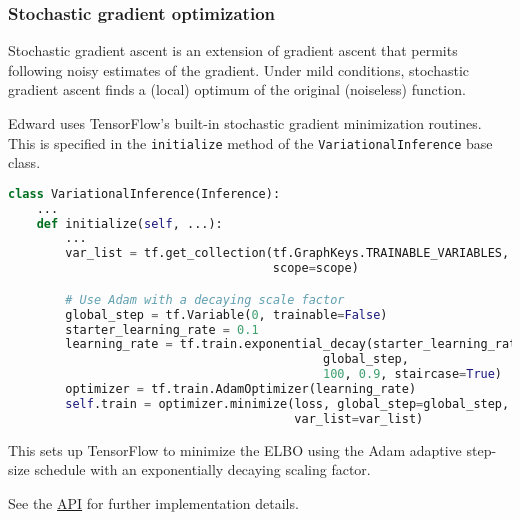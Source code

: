 \subsubsection{Stochastic gradient optimization}

Stochastic gradient ascent is an extension of gradient ascent that permits
following noisy estimates of the gradient. Under mild conditions, stochastic
gradient ascent finds a (local) optimum of the original (noiseless) function.

Edward uses TensorFlow's built-in stochastic gradient minimization routines.
This is specified in the \texttt{initialize} method of the 
\texttt{VariationalInference} base class.

\begin{lstlisting}[language=Python]
class VariationalInference(Inference):
    ...
    def initialize(self, ...):
        ...
        var_list = tf.get_collection(tf.GraphKeys.TRAINABLE_VARIABLES,
                                     scope=scope)

        # Use Adam with a decaying scale factor
        global_step = tf.Variable(0, trainable=False)
        starter_learning_rate = 0.1
        learning_rate = tf.train.exponential_decay(starter_learning_rate,
                                            global_step,
                                            100, 0.9, staircase=True)
        optimizer = tf.train.AdamOptimizer(learning_rate)
        self.train = optimizer.minimize(loss, global_step=global_step,
                                        var_list=var_list)
\end{lstlisting}

This sets up TensorFlow to minimize the ELBO using the Adam adaptive step-size
schedule with an exponentially decaying scaling factor.

See the \href{api/index.html}{API} for further implementation details.
